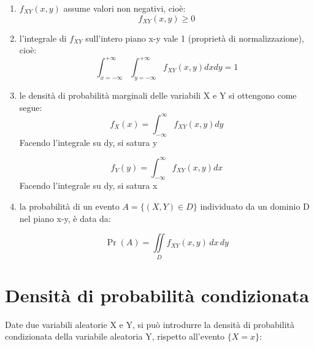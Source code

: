\begin{enumerate}
    \item $f_{XY} (x, y)$ assume valori non negativi, cioè: 
    {
        \Large 
        \begin{equation}
            f_{XY} (x, y) \geq 0
        \end{equation}
    }

    \item l'integrale di $f_{XY}$ sull'intero piano x-y vale 1 (proprietà di normalizzazione), cioè: 
    {
        \Large 
        \begin{equation}
            \int_{x = -\infty}^{+ \infty}
            \int_{y = -\infty}^{+ \infty}
            f_{XY} (x, y) dx dy = 1
        \end{equation}
    }

    \item le densità di probabilità marginali delle variabili X e Y si ottengono come segue:
    {
        \Large 
        \begin{equation}
            f_X (x) = \int_{-\infty}^{\infty} f_{XY} (x, y) dy 
        \end{equation}
    }
    Facendo l'integrale su dy, si satura y 

    {
        \Large 
        \begin{equation}
            f_Y (y) = \int_{-\infty}^{\infty} f_{XY} (x, y) dx 
        \end{equation}
    }
    Facendo l'integrale su dy, si satura x 
    
    \item la probabilità di un evento $A = \{(X, Y) \in D \}$ individuato da un dominio D nel piano x-y, è data da: 
    
    {
        \Large 
        \begin{equation}
            \Pr(A) = \iint \limits_{D} f_{XY} (x, y) \,dx \,dy
        \end{equation}
    }
    
\end{enumerate}

\newpage 

\section{Densità di probabilità condizionata} 

Date due variabili aleatorie X e Y, si può introdurre la densità di probabilità condizionata della variabile aleatoria Y, rispetto all'evento $\{X = x\}$: 

